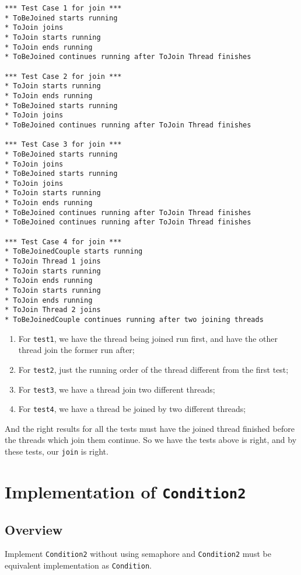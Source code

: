 \documentclass{article}
\begin{document}
\begin{lstlisting}
*** Test Case 1 for join ***
* ToBeJoined starts running
* ToJoin joins
* ToJoin starts running
* ToJoin ends running
* ToBeJoined continues running after ToJoin Thread finishes

*** Test Case 2 for join ***
* ToJoin starts running
* ToJoin ends running
* ToBeJoined starts running
* ToJoin joins
* ToBeJoined continues running after ToJoin Thread finishes

*** Test Case 3 for join ***
* ToBeJoined starts running
* ToJoin joins
* ToBeJoined starts running
* ToJoin joins
* ToJoin starts running
* ToJoin ends running
* ToBeJoined continues running after ToJoin Thread finishes
* ToBeJoined continues running after ToJoin Thread finishes

*** Test Case 4 for join ***
* ToBeJoinedCouple starts running
* ToJoin Thread 1 joins
* ToJoin starts running
* ToJoin ends running
* ToJoin starts running
* ToJoin ends running
* ToJoin Thread 2 joins
* ToBeJoinedCouple continues running after two joining threads
\end{lstlisting}

\begin{enumerate}
\item For \texttt{test1}, we have the thread being joined run first, and have the other thread join the former run after;
\item For \texttt{test2}, just the running order of the thread different from the first test;
\item For \texttt{test3}, we have a thread join two different threads;
\item For \texttt{test4}, we have a thread be joined by two different threads;
\end{enumerate}

And the right results for all the tests must have the joined thread finished before the threads which join them continue. So we have the tests above is right, and by these tests, our \texttt{join} is right.
\section{Implementation of \texttt{Condition2}}
\subsection{Overview}
Implement \texttt{Condition2} without using semaphore and \texttt{Condition2} must be equivalent implementation as \texttt{Condition}.
\end{document}
